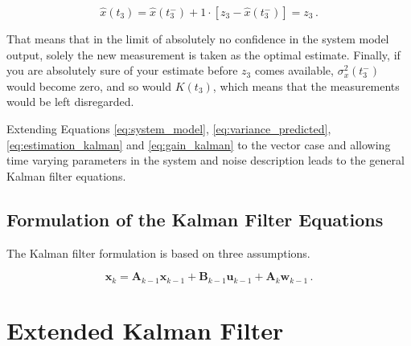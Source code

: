 \begin{equation}\label{eq:prediction_kalman}
  \hat{x}(t_3) = \hat{x}(t^-_3) + 1 \cdot [z_3-\hat{x}(t^-_3)] = z_3\,.
\end{equation}

\noindent
That means that in the limit of absolutely no confidence in the system model output, solely the new measurement is taken as the optimal estimate. Finally, if you are absolutely sure of your estimate before $z_3$ comes available, $\sigma^2_x(t^-_3)$ would become zero, and so would $K(t_3)$, which means that the measurements would be left disregarded. 

Extending Equations \ref{eq:system_model}, \ref{eq:variance_predicted}, \ref{eq:estimation_kalman} and \ref{eq:gain_kalman} to the vector case and allowing time varying parameters in the system and noise description leads to the general Kalman filter equations.

\subsection{Formulation of the Kalman Filter Equations}
 
The Kalman filter formulation is based on three assumptions.

\begin{equation}\label{eq:difference_equation}
  \mathbf{x}_k = \mathbf{A}_{k-1}\mathbf{x}_{k-1}+\mathbf{B}_{k-1}\mathbf{u}_{k-1}+\mathbf{A}_k\mathbf{w}_{k-1}\,.
\end{equation}

\section{Extended Kalman Filter}


